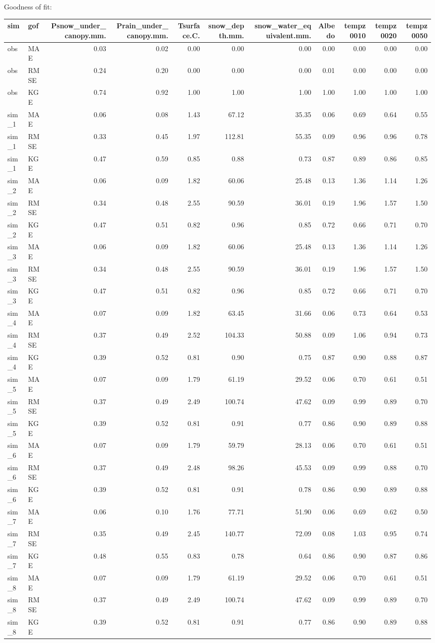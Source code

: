 \documentclass[
]{article}
\begin{document}
Goodness of fit:

\begin{longtable}[]{@{}llrrrrrrrrr@{}}
\toprule
sim & gof & Psnow\_under\_canopy.mm. & Prain\_under\_canopy.mm. &
Tsurface.C. & snow\_depth.mm. & snow\_water\_equivalent.mm. & Albedo &
tempz0010 & tempz0020 & tempz0050\tabularnewline
\midrule
\endhead
obs & MAE & 0.03 & 0.02 & 0.00 & 0.00 & 0.00 & 0.00 & 0.00 & 0.00 &
0.00\tabularnewline
obs & RMSE & 0.24 & 0.20 & 0.00 & 0.00 & 0.00 & 0.01 & 0.00 & 0.00 &
0.00\tabularnewline
obs & KGE & 0.74 & 0.92 & 1.00 & 1.00 & 1.00 & 1.00 & 1.00 & 1.00 &
1.00\tabularnewline
sim\_1 & MAE & 0.06 & 0.08 & 1.43 & 67.12 & 35.35 & 0.06 & 0.69 & 0.64 &
0.55\tabularnewline
sim\_1 & RMSE & 0.33 & 0.45 & 1.97 & 112.81 & 55.35 & 0.09 & 0.96 & 0.96
& 0.78\tabularnewline
sim\_1 & KGE & 0.47 & 0.59 & 0.85 & 0.88 & 0.73 & 0.87 & 0.89 & 0.86 &
0.85\tabularnewline
sim\_2 & MAE & 0.06 & 0.09 & 1.82 & 60.06 & 25.48 & 0.13 & 1.36 & 1.14 &
1.26\tabularnewline
sim\_2 & RMSE & 0.34 & 0.48 & 2.55 & 90.59 & 36.01 & 0.19 & 1.96 & 1.57
& 1.50\tabularnewline
sim\_2 & KGE & 0.47 & 0.51 & 0.82 & 0.96 & 0.85 & 0.72 & 0.66 & 0.71 &
0.70\tabularnewline
sim\_3 & MAE & 0.06 & 0.09 & 1.82 & 60.06 & 25.48 & 0.13 & 1.36 & 1.14 &
1.26\tabularnewline
sim\_3 & RMSE & 0.34 & 0.48 & 2.55 & 90.59 & 36.01 & 0.19 & 1.96 & 1.57
& 1.50\tabularnewline
sim\_3 & KGE & 0.47 & 0.51 & 0.82 & 0.96 & 0.85 & 0.72 & 0.66 & 0.71 &
0.70\tabularnewline
sim\_4 & MAE & 0.07 & 0.09 & 1.82 & 63.45 & 31.66 & 0.06 & 0.73 & 0.64 &
0.53\tabularnewline
sim\_4 & RMSE & 0.37 & 0.49 & 2.52 & 104.33 & 50.88 & 0.09 & 1.06 & 0.94
& 0.73\tabularnewline
sim\_4 & KGE & 0.39 & 0.52 & 0.81 & 0.90 & 0.75 & 0.87 & 0.90 & 0.88 &
0.87\tabularnewline
sim\_5 & MAE & 0.07 & 0.09 & 1.79 & 61.19 & 29.52 & 0.06 & 0.70 & 0.61 &
0.51\tabularnewline
sim\_5 & RMSE & 0.37 & 0.49 & 2.49 & 100.74 & 47.62 & 0.09 & 0.99 & 0.89
& 0.70\tabularnewline
sim\_5 & KGE & 0.39 & 0.52 & 0.81 & 0.91 & 0.77 & 0.86 & 0.90 & 0.89 &
0.88\tabularnewline
sim\_6 & MAE & 0.07 & 0.09 & 1.79 & 59.79 & 28.13 & 0.06 & 0.70 & 0.61 &
0.51\tabularnewline
sim\_6 & RMSE & 0.37 & 0.49 & 2.48 & 98.26 & 45.53 & 0.09 & 0.99 & 0.88
& 0.70\tabularnewline
sim\_6 & KGE & 0.39 & 0.52 & 0.81 & 0.91 & 0.78 & 0.86 & 0.90 & 0.89 &
0.88\tabularnewline
sim\_7 & MAE & 0.06 & 0.10 & 1.76 & 77.71 & 51.90 & 0.06 & 0.69 & 0.62 &
0.50\tabularnewline
sim\_7 & RMSE & 0.35 & 0.49 & 2.45 & 140.77 & 72.09 & 0.08 & 1.03 & 0.95
& 0.74\tabularnewline
sim\_7 & KGE & 0.48 & 0.55 & 0.83 & 0.78 & 0.64 & 0.86 & 0.90 & 0.87 &
0.86\tabularnewline
sim\_8 & MAE & 0.07 & 0.09 & 1.79 & 61.19 & 29.52 & 0.06 & 0.70 & 0.61 &
0.51\tabularnewline
sim\_8 & RMSE & 0.37 & 0.49 & 2.49 & 100.74 & 47.62 & 0.09 & 0.99 & 0.89
& 0.70\tabularnewline
sim\_8 & KGE & 0.39 & 0.52 & 0.81 & 0.91 & 0.77 & 0.86 & 0.90 & 0.89 &
0.88\tabularnewline
\bottomrule
\end{longtable}
\end{document}
